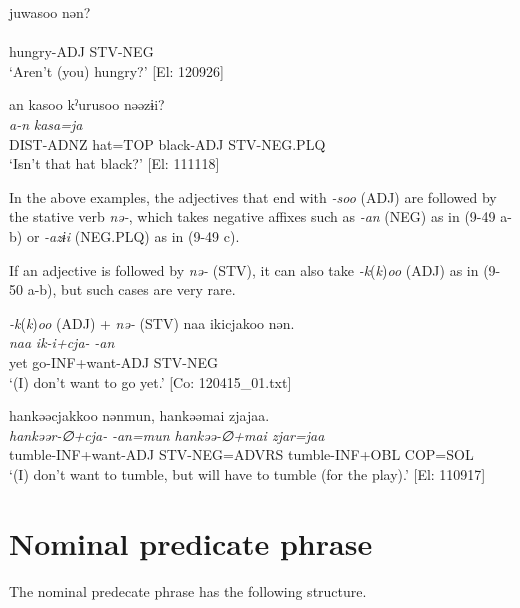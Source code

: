 \ex\relax [= (4-50 d)]
    \glll  juwasoo  nən?\\
      \textit{}  \textit{}\\
      hungry-ADJ  STV-NEG\\
      \glt       ‘Aren’t (you) hungry?’ [El: 120926]

\ex\relax [= (8-49 b)]
    \glll  an  kasoo  kˀurusoo  nəəzɨi?\\
      \textit{a-n}  \textit{kasa=ja}  \textit{}  \textit{}\\
      DIST-ADNZ  hat=TOP  black-ADJ  STV-NEG.PLQ\\
      \glt       ‘Isn’t that hat black?’ [El: 111118]
    \z
\z

In the above examples, the adjectives that end with \textit{{}-soo} (ADJ) are followed by the stative verb \textit{nə-}, which takes negative affixes such as \textit{{}-an} (NEG) as in (9-49 a-b) or \textit{{}-azɨi} (NEG.PLQ) as in (9-49 c).

If an adjective is followed by \textit{nə-} (STV), it can also take \textit{{}-k}(\textit{k})\textit{oo} (ADJ) as in (9-50 a-b), but such cases are very rare.

\ea   \textit{{}-k}(\textit{k})\textit{oo} (ADJ) + \textit{nə-} (STV) \label{ex:9.50}
\ea %
 \glll  naa  ikicjakoo  nən.\\
      \textit{naa}  \textit{ik-i+cja-}  \textit{-an}\\
      yet  go-INF+want-ADJ  STV-NEG\\
      \glt       ‘(I) don’t want to go yet.’ [Co: 120415\_01.txt]

\ex \label{ex:9.50b} %
    \glll  hankəəcjakkoo  nənmun,  hankəəmai  zjajaa.\\
      \textit{hankəər-∅+cja-}  \textit{-an=mun  hankəə-∅+mai  zjar=jaa}\\
      tumble-INF+want-ADJ  STV-NEG=ADVRS  tumble-INF+OBL  COP=SOL\\
      \glt       ‘(I) don’t want to tumble, but will have to tumble (for the play).’ [El: 110917]
    \z
\z

\section{Nominal predicate phrase}\label{sec:9.3}

The nominal predecate phrase has the following structure.

